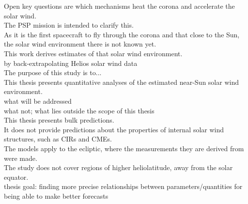 

Open key questions are which mechanisms heat the corona and accelerate the solar wind.\\
The PSP mission is intended to clarify this.\\
As it is the first spacecraft to fly through the corona and that close to the Sun, the solar wind environment there is not known yet.\\


This work derives estimates of that solar wind environment.\\

by back-extrapolating Helios solar wind data\\



The purpose of this study is to...\\
This thesis presents quantitative analyses of the estimated near-Sun solar wind environment.\\

what will be addressed\\
what not; what lies outside the scope of this thesis\\
This thesis presents bulk predictions.\\
It does not provide predictions about the properties of internal solar wind structures, such as CIRs and CMEs.\\
The models apply to the ecliptic, where the measurements they are derived from were made.\\
The study does not cover regions of higher heliolatitude, away from the solar equator.\\



thesis goal: finding more precise relationships between parameters/quantities for being able to make better forecasts\\


\bigskip

